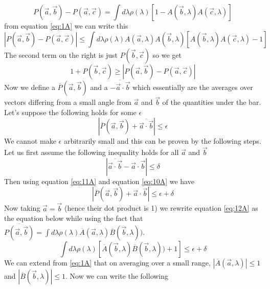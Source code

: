 \begin{equation}
\label{eq:7A}
P(\vec{a},\vec{b}) - P(\vec{a},\vec{c}) = \int{d\lambda}\rho(\lambda)[1-A(\vec{b},\lambda)A(\vec{c},\lambda)]
\end{equation}
from equation \ref{eq:1A} we can write this
\begin{equation}
\label{eq:8A}
|P(\vec{a},\vec{b}) - P(\vec{a},\vec{c})| \leq \int{d\lambda}\rho(\lambda)A(\vec{a},\lambda)A(\vec{b},\lambda)[A(\vec{b},\lambda)A(\vec{c},\lambda) - 1]
\end{equation}
The second term on the right is just $P(\vec{b},\vec{c})$ so we get
\begin{equation}
\label{eq:9A}1 + P(\vec{b},\vec{c}) \geq |P(\vec{a},\vec{b}) - P(\vec{a},\vec{c})|
\end{equation}
Now we define a $\overline{P}(\vec{a},\vec{b})$ and a $\overline{- \vec{a}\cdot\vec{b}}$ which essentially are the averages over vectors differing from a small angle from $\vec{a}$ and $\vec{b}$ of the quantities under the bar. Let's suppose the following holds for some $\epsilon$
\begin{equation}
\label{eq:10A}|\overline{P}(\vec{a},\vec{b}) + \overline{\vec{a}\cdot\vec{b}}| \leq \epsilon
\end{equation}
We cannot make $\epsilon$ arbitrarily small and this can be proven by the following steps. Let us first assume the following inequality holds for all $\vec{a}$ and $\vec{b}$
\begin{equation}
\label{eq:11A}
|\overline{\vec{a}\cdot\vec{b}} - \vec{a}\cdot\vec{b}| \leq\delta
\end{equation}
Then using equation \ref{eq:11A} and equation \ref{eq:10A} we have
\begin{equation}
\label{eq:12A}
|\overline{P}(\vec{a},\vec{b}) + \vec{a}\cdot\vec{b}| \leq \epsilon + \delta
\end{equation}
Now taking $\vec{a} = \vec{b}$ (hence their dot product is 1) we rewrite equation \ref{eq:12A} as the equation below while using the fact that $\overline{P(\vec{a},\vec{b})} = \int d\lambda\rho(\lambda)\overline{A}(\vec{a},\lambda)\overline{B}(\vec{b},\lambda))$.
\begin{equation}
\label{eq:13A}
\int d\lambda\rho(\lambda)[\overline{A}(\vec{b},\lambda)\overline{B}(\vec{b},\lambda))+1] \leq\epsilon+\delta
\end{equation}
We can extend from \ref{eq:1A} that on averaging over a small range, $|\overline{A}(\vec{a},\lambda)| \leq 1$ and $|\overline{B}(\vec{b},\lambda)| \leq 1$. Now we can write the following
